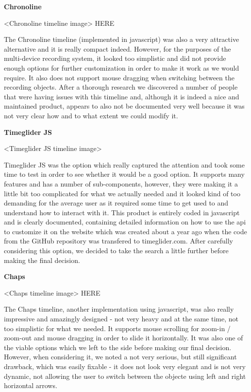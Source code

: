 \documentclass{l3proj}
\begin{document}
\textbf{Chronoline}

<Chronoline timeline image> HERE

The Chronoline timeline (implemented in javascript) was also a very attractive alternative and it is really compact indeed. However, for the purposes of the multi-device recording system, it looked too simplistic and did not provide enough options for further customization in order to make it work as we would require. It also does not support mouse dragging when switching between the recording objects. After a thorough research we discovered a number of people that were having issues with this timeline and, although it is indeed a nice and maintained product, appears to also not be documented very well because it was not very clear how and to what extent we could modify it.


\textbf{Timeglider JS}

<Timeglider JS timeline image>

Timeglider JS was the option which really captured the attention and took some time to test in order to see whether it would be a good option. It supports many features and has a number of sub-components, however, they were making it a little bit too complicated for what we actually needed and it looked kind of too demanding for the average user as it required some time to get used to and understand how to interact with it. This product is entirely coded in javascript and is clearly documented, containing detailed information on how to use the api to customize it on the website which was created about a year ago when the code from the GitHub repository was transfered to timeglider.com. After carefully considering this option, we decided to take the search a little further before making the final decision.


\textbf{Chaps}

<Chaps timeline image> HERE

The Chaps timeline, another implementation using javascript, was also really impressive and amazingly designed - not very heavy and at the same time, not too simplistic for what we needed. It supports mouse scrolling for zoom-in / zoom-out and mouse dragging in order to slide it horizontally. It was also one of the viable options which we left to the side before making our final decision. However, when considering it, we noted a not very serious, but still significant drawback, which was easily fixable - it does not look very elegant and is not very dynamic, not allowing the user to switch between the objecte using left and right horizontal arrows.
\end{document}
